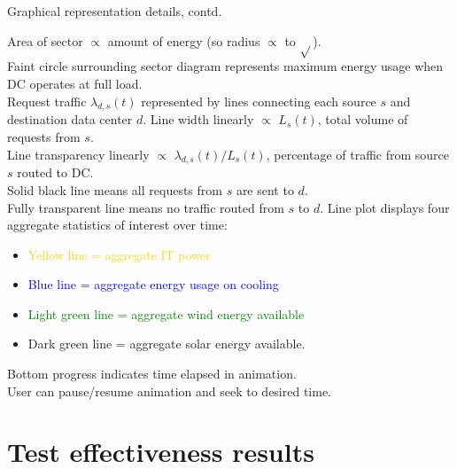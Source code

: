 \documentclass[xcolor=dvipsnames]{beamer}
\begin{document}
\begin{frame}{Graphical representation details, contd.}

	Area of sector $\propto$ amount of energy (so radius $\propto$ to $\sqrt{}$). \\ 
	Faint circle surrounding sector diagram represents maximum energy usage when DC operates at full load. \\
	Request traffic $\lambda_{d,s}(t)$ represented by lines connecting each source $s$ and destination data center $d$. 
	Line width linearly $\propto$ $L_s(t)$, total volume of requests from $s$. \\
	Line transparency linearly $\propto$ ${\lambda_{d,s}(t)} / {L_s(t)}$, percentage of traffic from source $s$ routed to DC.  \\
	Solid black line means all requests from $s$ are sent to $d$. \\
	Fully transparent line means no traffic routed from $s$ to $d$.
	Line plot displays four aggregate statistics of interest over time: 
	\begin{itemize}
	\item{\textcolor{gold}{Yellow line = aggregate IT power}}
	\item{\textcolor{blue}{Blue line = aggregate energy usage on cooling}}
	\item{\textcolor{green}{Light green line = aggregate wind energy available}}
	\item{\textcolor{dgreen}{Dark green line = aggregate solar energy available}.}
	\end{itemize}
	Bottom progress indicates time elapsed in animation. \\
	User can pause/resume animation and seek to desired time.

\end{frame}

\section{Test effectiveness results}
\end{document}

